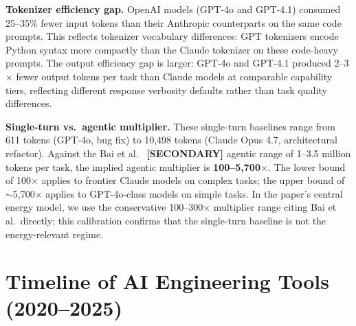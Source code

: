 \documentclass{article}
\newcommand{\SECONDARY}{\textbf{[SECONDARY]}}
\begin{document}
\textbf{Tokenizer efficiency gap.}
OpenAI models (GPT-4o and GPT-4.1) consumed 25--35\% fewer input tokens than their Anthropic
counterparts on the same code prompts. This reflects tokenizer vocabulary differences:
GPT tokenizers encode Python syntax more compactly than the Claude tokenizer on these
code-heavy prompts. The output efficiency gap is larger: GPT-4o and GPT-4.1 produced
2--3$\times$ fewer output tokens per task than Claude models at comparable capability tiers,
reflecting different response verbosity defaults rather than task quality differences.

\textbf{Single-turn vs.\ agentic multiplier.}
These single-turn baselines range from 611 tokens (GPT-4o, bug fix) to 10{,}498 tokens
(Claude Opus 4.7, architectural refactor). Against the Bai et al.~\citep{bai2026agent}
\SECONDARY{} agentic range of 1--3.5 million tokens per task, the implied agentic
multiplier is \textbf{100--5{,}700$\times$}. The lower bound of 100$\times$ applies to
frontier Claude models on complex tasks; the upper bound of $\sim$5{,}700$\times$ applies
to GPT-4o-class models on simple tasks. In the paper's central energy model, we use the
conservative 100--300$\times$ multiplier range citing Bai et al.\ directly; this calibration
confirms that the single-turn baseline is not the energy-relevant regime.

\section{Timeline of AI Engineering Tools (2020--2025)}
\label{app:timeline}
\end{document}
